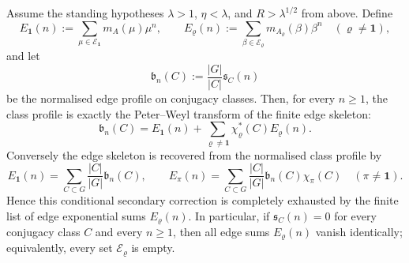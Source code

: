 \begin{proposition}
  \label{prop:secondary-edge-skeleton}
  Assume the standing hypotheses \(\lambda>1\), \(\eta<\lambda\), and
  \(R>\lambda^{1/2}\) from above.  Define
  \[
    E_{\mathbf 1}(n)
    :=\sum_{\mu\in\mathcal E_{\mathbf 1}}m_A(\mu)\mu^n,
    \qquad
    E_\varrho(n)
    :=\sum_{\beta\in\mathcal E_\varrho}
      m_{A_\varrho}(\beta)\beta^n
    \quad(\varrho\neq\mathbf 1),
  \]
  and let
  \[
    \mathfrak b_n(C):=\frac{|G|}{|C|}\mathfrak s_C(n)
  \]
  be the normalised edge profile on conjugacy classes. Then, for every
  \(n\ge1\), the class profile is exactly the Peter--Weyl transform of
  the finite edge skeleton:
  \begin{equation}\label{eq:secondary-edge-forward}
    \mathfrak b_n(C)
    =
    E_{\mathbf 1}(n)+
    \sum_{\varrho\neq\mathbf 1}\chi_\varrho^\ast(C)E_\varrho(n).
  \end{equation}
  Conversely the edge skeleton is recovered from the normalised class
  profile by
  \begin{equation}\label{eq:secondary-edge-inverse}
    E_{\mathbf 1}(n)
    =\sum_{C\subset G}\frac{|C|}{|G|}\mathfrak b_n(C),
    \qquad
    E_\pi(n)
    =\sum_{C\subset G}\frac{|C|}{|G|}\mathfrak b_n(C)\chi_\pi(C)
    \quad(\pi\neq\mathbf 1).
  \end{equation}
  Hence this conditional secondary correction is completely exhausted by
  the finite list of edge exponential sums \(E_\varrho(n)\). In
  particular, if \(\mathfrak s_C(n)=0\) for every conjugacy class \(C\)
  and every \(n\ge1\), then all edge sums \(E_\varrho(n)\) vanish
  identically; equivalently, every set \(\mathcal E_\varrho\) is empty.
\end{proposition}


